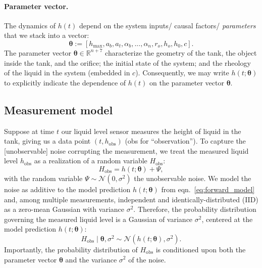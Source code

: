 \documentclass[openacc]{rsproca_new}%
\begin{document}
\paragraph{Parameter vector.} The dynamics of $h(t)$ depend on the system inputs/ causal factors/ \emph{parameters} that we stack into a vector:
\begin{equation}
	\boldsymbol \theta := [h_{\text{max}}, a_b, a_t, \alpha_b, ..., \alpha_n , r_o, h_o, h_0, c].
\end{equation}
The parameter vector $\boldsymbol \theta \in \mathbb{R}^{n+7}$ characterize the geometry of the tank, the object inside the tank, and the orifice; the initial state of the system; and the rheology of the liquid in the system (embedded in $c$). Consequently, we may write $h(t; \boldsymbol \theta)$ to explicitly indicate the dependence of $h(t)$ on the parameter vector $\boldsymbol \theta$. 

\subsection{Measurement model}
Suppose at time $t$ our liquid level sensor measures the height of liquid in the tank, giving us a data point $(t, h_{\text{obs}})$ (obs for ``observation''). 
To capture the [unobservable] noise corrupting the measurement, we treat the measured liquid level $h_{\text{obs}}$ as a realization of a random variable $H_{\text{obs}}$:
\begin{equation}
	H_{\text{obs}} = h(t; \boldsymbol \theta)  + \Psi,
\end{equation}
with the random variable $\Psi \sim \mathcal{N}(0, \sigma^2)$ the unobservable noise. 
We model the noise as additive to the model prediction $h(t; \boldsymbol \theta)$ from eqn.~\ref{eq:forward_model} and, among multiple measurements, independent and identically-distributed (IID) as a zero-mean Gaussian with variance $\sigma^2$. 
Therefore, the probability distribution governing the measured liquid level is a Gaussian of variance $\sigma^2$, centered at the model prediction $h(t;\boldsymbol \theta)$:
\begin{equation}
	H_{\text{obs}} \mid \boldsymbol  \theta, \sigma^2 \sim \mathcal{N}(h(t; \boldsymbol \theta), \sigma^2). \label{eq:H_obs_distn}
\end{equation} Importantly, the probability distribution of $H_{\text{obs}}$ is conditioned upon both the parameter vector $\boldsymbol  \theta$ and the variance $\sigma^2$ of the noise.

\end{document}
